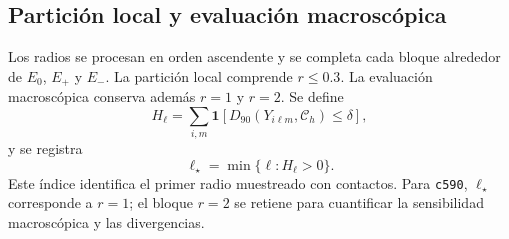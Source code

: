 \subsection{Partición local y evaluación macroscópica}
\label{subsec:detencion_primer_contacto}

Los radios se procesan en orden ascendente y se completa cada bloque alrededor
de \(E_0\), \(E_+\) y \(E_-\). La partición local comprende \(r\leq0.3\).
La evaluación macroscópica conserva además \(r=1\) y \(r=2\). Se define
\[
H_\ell=\sum_{i,m}
\mathbf 1\!\left[
D_{90}(Y_{i\ell m},\mathcal C_h)\leq\delta
\right],
\]
y se registra
\begin{equation}
\ell_\star=\min\{\ell:H_\ell>0\}.
\label{eq:primer_radio_contacto}
\end{equation}
Este índice identifica el primer radio muestreado con contactos. Para \texttt{c590}, \(\ell_\star\)
corresponde a \(r=1\); el bloque \(r=2\) se retiene para cuantificar la
sensibilidad macroscópica y las divergencias.

